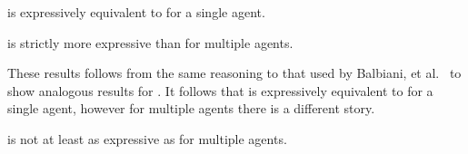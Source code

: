 \begin{theorem}
    \logicPapalS{} is expressively equivalent to \logicPalS{} for a single agent.
\end{theorem}

\begin{theorem}
    \logicPapalS{} is strictly more expressive than \logicPalS{} for multiple agents.
\end{theorem}

These results follows from the same reasoning to that used by Balbiani, et al.~\cite{balbianietal:2008} to show analogous results for \logicApalS{}.
It follows that \logicPapalS{} is expressively equivalent to \logicApalS{} for a single agent, however for multiple agents there is a different story.

\begin{theorem}\label{expressivity-s5}
    \logicPapalS{} is not at least as expressive as \logicApalS{} for multiple agents.
\end{theorem}


